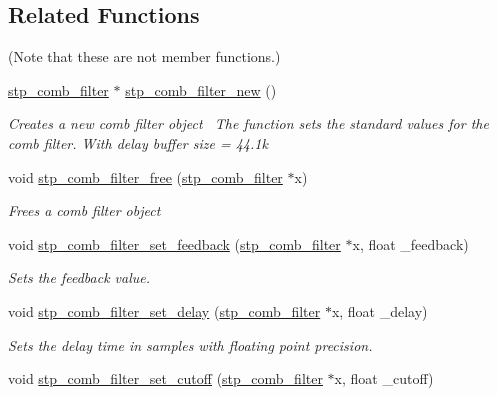 \subsection*{Related Functions}
(Note that these are not member functions.) \begin{DoxyCompactItemize}
\item 
\hyperlink{structstp__comb__filter}{stp\+\_\+comb\+\_\+filter} $\ast$ \hyperlink{structstp__comb__filter_a9003efe4c8aa14593421023d68dd4561}{stp\+\_\+comb\+\_\+filter\+\_\+new} ()
\begin{DoxyCompactList}\small\item\em Creates a new comb filter object~\newline
 The function sets the standard values for the comb filter. With delay buffer size = 44.\+1k ~\newline
 \end{DoxyCompactList}\item 
void \hyperlink{structstp__comb__filter_af66ef0a2a2c26180060016257cf56e53}{stp\+\_\+comb\+\_\+filter\+\_\+free} (\hyperlink{structstp__comb__filter}{stp\+\_\+comb\+\_\+filter} $\ast$x)
\begin{DoxyCompactList}\small\item\em Frees a comb filter object~\newline
 \end{DoxyCompactList}\item 
void \hyperlink{structstp__comb__filter_a552185fbb2f8236961c25ed67ed62033}{stp\+\_\+comb\+\_\+filter\+\_\+set\+\_\+feedback} (\hyperlink{structstp__comb__filter}{stp\+\_\+comb\+\_\+filter} $\ast$x, float \+\_\+feedback)
\begin{DoxyCompactList}\small\item\em Sets the feedback value. ~\newline
 \end{DoxyCompactList}\item 
void \hyperlink{structstp__comb__filter_a85a221fad983cb07992599fb489b6dca}{stp\+\_\+comb\+\_\+filter\+\_\+set\+\_\+delay} (\hyperlink{structstp__comb__filter}{stp\+\_\+comb\+\_\+filter} $\ast$x, float \+\_\+delay)
\begin{DoxyCompactList}\small\item\em Sets the delay time in samples with floating point precision. ~\newline
 \end{DoxyCompactList}\item 
void \hyperlink{structstp__comb__filter_a5a406b611d85b0d62bac85e9a85c48ab}{stp\+\_\+comb\+\_\+filter\+\_\+set\+\_\+cutoff} (\hyperlink{structstp__comb__filter}{stp\+\_\+comb\+\_\+filter} $\ast$x, float \+\_\+cutoff)

\end{DoxyCompactItemize}
